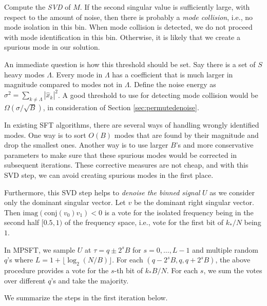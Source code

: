 \documentclass[10pt]{article}
\begin{document}
Compute the \emph{SVD} of $M$. If the second singular value is sufficiently large, with respect to the amount of noise, then there is probably a \emph{mode collision}, i.e., no mode isolation in this bin. When mode collision is detected, we do not proceed with mode identification in this bin. Otherwise, it is likely that we create a spurious mode in our solution.

An immediate question is how this threshold should be set. Say there is a set of $S$ heavy modes $\Lambda$. Every mode in $\Lambda$ has a coefficient that is much larger in magnitude compared to modes not in $\Lambda$. Define the noise energy as $\sigma^2= \sum_{k\neq \Lambda} |\hat{x}_k|^2$. A good threshold to use for detecting mode collision would be $\Omega(\sigma/\sqrt{B})$, in consideration of Section \ref{sec:permutedenoise}.

In existing SFT algorithms, there are several ways of handling wrongly identified modes. One way is to sort $O(B)$ modes that are found by their magnitude and drop the smallest ones. Another way is to use larger $B$'s and more conservative parameters to make sure that these spurious modes would be corrected in subsequent iterations. These corrective measures are not cheap, and with this SVD step, we can avoid creating spurious modes in the first place.

Furthermore, this SVD step helps to \emph{denoise the binned signal} $U$ as we consider only the dominant singular vector. Let $v$ be the dominant right singular vector. Then $\text{imag}(\text{conj}(v_0)v_1)<0$ is a vote for the isolated frequency being in the second half $[0.5,1)$ of the frequency space, i.e., vote for the first bit of $k_*/N$ being $1$.

In MPSFT, we sample $U$ at $\tau=q \pm 2^s B$ for $s=0,\ldots,L-1$ and multiple random $q$'s where $L=1 + \lfloor \log_2 (N/B) \rfloor$. For each $(q-2^s B, q, q+2^s B)$, the above procedure provides a vote for the $s$-th bit of $k_* B/N$. For each $s$, we sum the votes over different $q$'s and take the majority.

We summarize the steps in the first iteration below.
\end{document}
